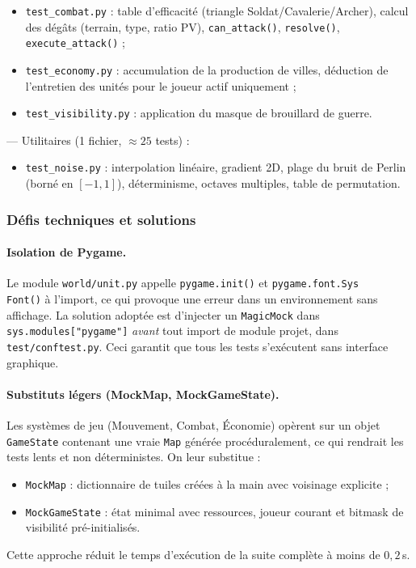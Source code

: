 \documentclass[12pt, a4paper]{article}
\begin{document}
\begin{description}[leftmargin=2em]
\begin{itemize}
        \item \texttt{test\_combat.py} : table d'efficacité (triangle Soldat/Cavalerie/Archer),
        calcul des dégâts (terrain, type, ratio PV), \texttt{can\_attack()}, \texttt{resolve()},
        \texttt{execute\_attack()} ;
        \item \texttt{test\_economy.py} : accumulation de la production de villes, déduction
        de l'entretien des unités pour le joueur actif uniquement ;
        \item \texttt{test\_visibility.py} : application du masque de brouillard de guerre.
    \end{itemize}
    \item[\texttt{test/utils/}] — Utilitaires (1 fichier, $\approx 25$ tests) :
    \begin{itemize}
        \item \texttt{test\_noise.py} : interpolation linéaire, gradient 2D, plage du bruit de
        Perlin (borné en $[-1, 1]$), déterminisme, octaves multiples, table de permutation.
    \end{itemize}
\end{description}

\subsubsection{Défis techniques et solutions}

\paragraph{Isolation de Pygame.}
Le module \texttt{world/unit.py} appelle \texttt{pygame.init()} et
\texttt{pygame.font.Sys\\Font()} à l'import, ce qui provoque une erreur dans un environnement
sans affichage. La solution adoptée est d'injecter un \texttt{MagicMock} dans
\texttt{sys.modules["pygame"]} \emph{avant} tout import de module projet, dans
\texttt{test/conftest.py}. Ceci garantit que tous les tests s'exécutent sans interface
graphique.

\paragraph{Substituts légers (MockMap, MockGameState).}
Les systèmes de jeu (Mouvement, Combat, Économie) opèrent sur un objet \texttt{GameState}
contenant une vraie \texttt{Map} générée procéduralement, ce qui rendrait les tests lents et
non déterministes. On leur substitue :
\begin{itemize}
    \item \texttt{MockMap} : dictionnaire de tuiles créées à la main avec voisinage explicite ;
    \item \texttt{MockGameState} : état minimal avec ressources, joueur courant et bitmask
    de visibilité pré-initialisés.
\end{itemize}
Cette approche réduit le temps d'exécution de la suite complète à moins de $0{,}2$\,s.
\end{document}
